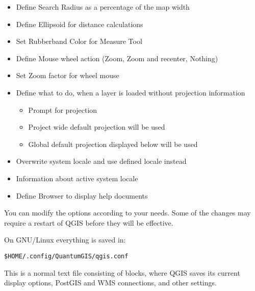 
\begin{itemize}
\item Define Search Radius as a percentage of the map width
\item Define Ellipsoid for distance calculations
\item Set Rubberband Color for Measure Tool
\item Define Mouse wheel action (Zoom, Zoom and recenter, Nothing)
\item Set Zoom factor for wheel mouse
\end{itemize}


\begin{itemize}
\item Define what to do, when a layer is loaded without projection information
\begin{itemize}
\item Prompt for projection
\item Project wide default projection will be used
\item Global default projection displayed below will be used
\end{itemize}
\end{itemize}


\begin{itemize}
\item Overwrite system locale and use defined locale instead
\item Information about active system locale
\end{itemize}


\begin{itemize}
\item Define Browser to display help documents
\end{itemize}

You can modify the options according to your needs. Some of the changes may 
require a restart of QGIS before they will be effective.

On GNU/Linux everything is saved in:
\begin{verbatim}
$HOME/.config/QuantumGIS/qgis.conf
\end{verbatim}
This is a normal text file consisting of blocks, where QGIS saves its current
display options, PostGIS and WMS connections, and other settings.

